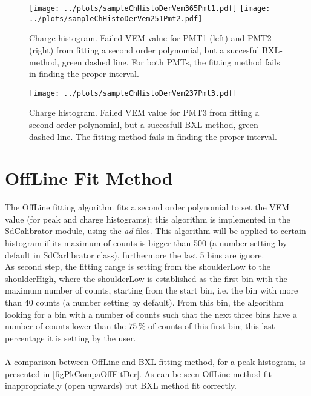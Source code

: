 \documentclass[twoside, final, 10pt]{articleMine}
\begin{document}
\begin{figure}[!tbh]
  \centering
  \subfigure
  {
    \texttt{[image: ../plots/sampleChHistoDerVem365Pmt1.pdf]}
    \texttt{[image: ../plots/sampleChHistoDerVem251Pmt2.pdf]}
  }
  \caption{Charge histogram. Failed VEM value for PMT1 (left) and
  PMT2 (right) from fitting a second order polynomial, but a
  succesful BXL-method, green dashed line. For both PMTs, the
  fitting method fails in finding the proper interval.}
  \label{figChSampleFailFitGoodDerpmt12}
\end{figure}

\begin{figure}[!tbh]
  \centering
  \subfigure
  {
    \texttt{[image: ../plots/sampleChHistoDerVem237Pmt3.pdf]}
  }
  \caption{Charge histogram. Failed VEM value for PMT3 from
  fitting a second order polynomial, but a succesfull BXL-method,
  green dashed line. The fitting method fails in finding the
  proper interval.}
  \label{figChSampleFailFitGoodDerpmt3}
\end{figure}
\clearpage


\section{OffLine Fit Method}
The OffLine fitting algorithm fits a second order polynomial to
set the VEM value (for peak and charge histograms); this
algorithm  is implemented in the SdCalibrator module, using the
{\it ad} files. This algorithm will be applied to certain
histogram if its maximum of counts is bigger than 500 (a number
setting by default in SdCarlibrator class), furthermore the last
5 bins are ignore.\\As second step, the fitting range is setting
from the shoulderLow to the shoulderHigh, where the shoulderLow
is established as the first bin with the maximum number of
counts, starting from the start bin, i.e. the bin with more than
40 counts (a number setting by default). From this bin, the
algorithm looking for a bin with a number of counts such that the
next three bins have a number of counts lower than the $75$\,\%
of counts of this first bin; this last percentage it is setting
by the user.\\\\A comparison between OffLine and BXL fitting
method, for a peak histogram, is presented in
\ref{figPkCompaOffFitDer}. As can be seen OffLine method fit
inappropriately (open upwards) but BXL method fit correctly.
\clearpage
\end{document}
